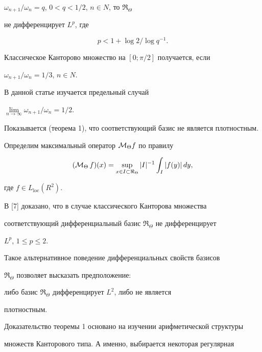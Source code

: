 $\omega_{n+1} / \omega_n=q$, $0<q<1/2$, $n \in N$, то $\Re_{\Theta}$


не дифференцирует $L^p$, где


$$


p < 1+\log 2 / \log q^{-1}.


$$


Классическое Канторово множество на $[0;\pi/2]$ получается, если


$\omega_{n+1} / \omega_n=1/3$, $n \in N$.





В данной статье изучается предельный случай


$\lim\limits_{n \to \infty} \omega_{n+1} / \omega_n=1/2$.


Показывается (теорема 1), что соответствующий базис не является плотностным.





Определим максимальный оператор $ {\cal M}_{\Theta}f $ по правилу


$$


({\cal M}_{\Theta}\, f) (x) = \sup_{x \in I \subset


\Re_{\Theta}}| I |^{-1} \int_I | f(y) | \, dy,


$$


где $f \in L_{\text{loc}} (R^2)$.





В [7] доказано, что в случае классического Канторова множества


соответствующий дифференциальный базис $\Re_{\Theta}$ не дифференцирует


$L^p$, $1 \le p \le 2$.





Такое альтернативное поведение дифференциальных свойств базисов


$\Re_{\Theta}$ позволяет высказать предположение:


{\it


либо базис $\Re_{\Theta}$ дифференцирует $L^2$, либо не является


плотностным.}





Доказательство теоремы 1 основано на изучении арифметической структуры


множеств Канторового типа. А именно, выбирается некоторая регулярная


